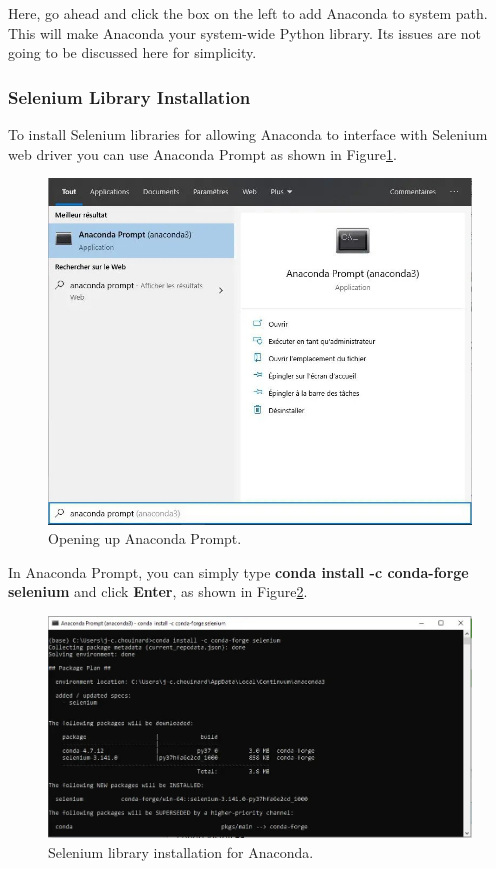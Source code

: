Here, go ahead and click the box on the left to add Anaconda to system path. This will
make Anaconda your system-wide Python library. Its issues are not going to be discussed
here for simplicity.

\subsubsection{Selenium Library Installation}
To install Selenium libraries for allowing Anaconda to interface with Selenium web
driver you can use Anaconda Prompt as shown in Figure\ref{fig:AnacondaPrompt}.

\begin{figure}[H]
    \centering
    \includegraphics[angle=0,origin=c,width = .8\linewidth]{Section_Ethernet/Figures/anaconda-prompt.jpg}
    \caption{Opening up Anaconda Prompt.}
    \label{fig:AnacondaPrompt}
\end{figure}

In Anaconda Prompt, you can simply type \textbf{conda install -c conda-forge selenium}
and click \textbf{Enter}, as shown in Figure\ref{fig:SeleniumAnaconda}.

\begin{figure}[H]
    \centering
    \includegraphics[angle=0,origin=c,width = .8\linewidth]{Section_Ethernet/Figures/install-selenium.jpg}
    \caption{Selenium library installation for Anaconda.}
    \label{fig:SeleniumAnaconda}
\end{figure}


